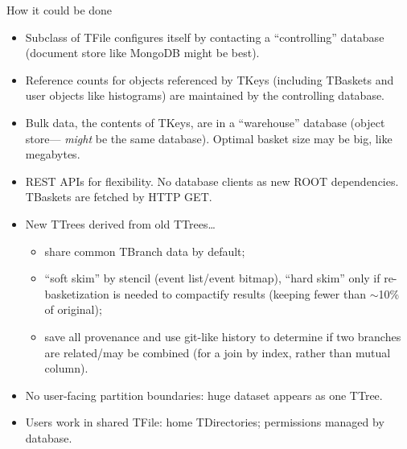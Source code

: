 \documentclass[aspectratio=169]{beamer}
\begin{document}
\begin{frame}{How it could be done}
\vspace{0.3 cm}
\begin{itemize}
\item<1-> Subclass of TFile configures itself by contacting a ``controlling'' database (document store like MongoDB might be best).
\item<2-> Reference counts for objects referenced by TKeys (including TBaskets and user objects like histograms) are maintained by the controlling database.
\item<3-> Bulk data, the contents of TKeys, are in a ``warehouse'' database (object store--- \mbox{\it might} be the same database). Optimal basket size may be big, like megabytes.
\item<4-> REST APIs for flexibility. No database clients as new ROOT dependencies. TBaskets are fetched by HTTP GET.
\item<5-> New TTrees derived from old TTrees\ldots
\begin{itemize}
\item<6-> share common TBranch data by default;
\item<7-> ``soft skim'' by stencil (event list/event bitmap), ``hard skim'' only if re-basketization is needed to compactify results (keeping fewer than $\sim$10\% of original);
\item<8-> save all provenance and use git-like history to determine if two branches are related/may be combined (for a join by index, rather than mutual column).
\end{itemize}
\item<9-> No user-facing partition boundaries: huge dataset appears as one TTree.
\item<10-> Users work in shared TFile: home TDirectories; permissions managed by database.
\end{itemize}
\end{frame}
\end{document}
